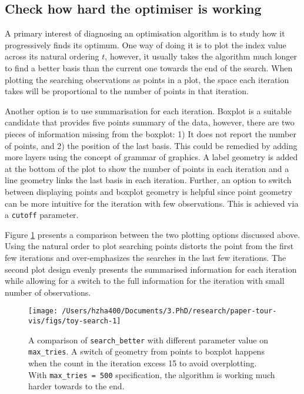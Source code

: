 \documentclass[12pt]{article}
\begin{document}
\hypertarget{check-how-hard-the-optimiser-is-working}{%
\subsection{Check how hard the optimiser is working}\label{check-how-hard-the-optimiser-is-working}}

A primary interest of diagnosing an optimisation algorithm is to study how it progressively finds its optimum. One way of doing it is to plot the index value across its natural ordering \(t\), however, it usually takes the algorithm much longer to find a better basis than the current one towards the end of the search.
When plotting the searching observations as points in a plot, the space each iteration takes will be proportional to the number of points in that iteration.

Another option is to use summarisation for each iteration. Boxplot is a suitable candidate that provides five points summary of the data, however, there are two pieces of information missing from the boxplot: 1) It does not report the number of points, and 2) the position of the last basis. This could be remedied by adding more layers using the concept of grammar of graphics. A label geometry is added at the bottom of the plot to show the number of points in each iteration and a line geometry links the last basis in each iteration. Further, an option to switch between displaying points and boxplot geometry is helpful since point geometry can be more intuitive for the iteration with few observations. This is achieved via a \texttt{cutoff} parameter.

Figure \ref{fig:toy-search} presents a comparison between the two plotting options discussed above. Using the natural order to plot searching points distorts the point from the first few iterations and over-emphasizes the searches in the last few iterations. The second plot design evenly presents the summarised information for each iteration while allowing for a switch to the full information for the iteration with small number of observations.

\begin{figure}

{\centering \texttt{[image: /Users/hzha400/Documents/3.PhD/research/paper-tour-vis/figs/toy-search-1]} 

}

\caption{A comparison of \texttt{search\_better} with different parameter value on \texttt{max\_tries}. A switch of geometry from points to boxplot happens when the count in the iteration excess 15 to avoid overplotting. With \texttt{max\_tries\ =\ 500} specification, the algorithm is working much harder towards to the end.}\label{fig:toy-search}
\end{figure}
\end{document}
